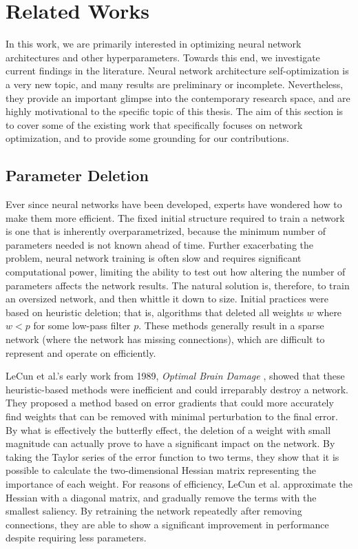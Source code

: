 \chapter{Related Works}

In this work, we are primarily interested in optimizing neural network architectures and other hyperparameters.
Towards this end, we investigate current findings in the literature.
Neural network architecture self-optimization is a very new topic, and many results are preliminary or incomplete.
Nevertheless, they provide an important glimpse into the contemporary research space, and are highly motivational to the specific topic of this thesis.
The aim of this section is to cover some of the existing work that specifically focuses on network optimization, and to provide some grounding for our contributions.

\section{Parameter Deletion}
Ever since neural networks have been developed, experts have wondered how to make them more efficient.
The fixed initial structure required to train a network is one that is inherently overparametrized, because the minimum number of parameters needed is not known ahead of time.
Further exacerbating the problem, neural network training is often slow and requires significant computational power, limiting the ability to test out how altering the number of parameters affects the network results.
The natural solution is, therefore, to train an oversized network, and then whittle it down to size.
Initial practices were based on heuristic deletion; that is, algorithms that deleted all weights $w$ where $w < p$ for some low-pass filter $p$.
These methods generally result in a sparse network (where the network has missing connections), which are difficult to represent and operate on efficiently.

LeCun et al.'s early work from 1989, \emph{Optimal Brain Damage} \cite{lecun1989optimal}, showed that these heuristic-based methods were inefficient and could irreparably destroy a network.
They proposed a method based on error gradients that could more accurately find weights that can be removed with minimal perturbation to the final error.
By what is effectively the butterfly effect, the deletion of a weight with small magnitude can actually prove to have a significant impact on the network.
By taking the Taylor series of the error function to two terms, they show that it is possible to calculate the two-dimensional Hessian matrix representing the importance of each weight.
For reasons of efficiency, LeCun et al. approximate the Hessian with a diagonal matrix, and gradually remove the terms with the smallest saliency.
By retraining the network repeatedly after removing connections, they are able to show a significant improvement in performance despite requiring less parameters.

